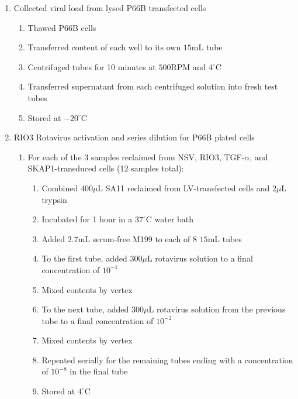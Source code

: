 \begin{enumerate}
	\item Collected viral load from lysed P66B transfected cells
		\begin{enumerate}
			\item Thawed P66B cells
			\item Transferred content of each well to its own $15$mL tube
			\item Centrifuged tubes for 10 minutes at $500$RPM and $4^{\circ}$C
			\item Transferred supernatant from each centrifuged solution into fresh test tubes
			\item Stored at $-20^{\circ}$C
		\end{enumerate}
	\item RIO3 Rotavirus activation and series dilution for P66B plated cells
		\begin{enumerate}
			\item For each of the 3 samples reclaimed from NSV, RIO3, TGF-$\alpha$, and SKAP1-transduced cells (12 samples total):
				\begin{enumerate}
					\item Combined $400\mu$L SA11 reclaimed from LV-transfected cells and $2\mu$L trypsin
					\item Incubated for 1 hour in a $37^{\circ}$C water bath
					\item Added $2.7$mL serum-free M199 to each of 8 $15$mL tubes
					\item To the first tube, added $300\mu$L rotavirus solution to a final concentration of $10^{-1}$
					\item Mixed contents by vertex
					\item To the next tube, added $300\mu$L rotavirus solution from the previous tube to a final concentration of $10^{-2}$
					\item Mixed contents by vertex
					\item Repeated serially for the remaining tubes ending with a concentration of $10^{-8}$ in the final tube
					\item Stored at $4^{\circ}$C
				\end{enumerate}
		\end{enumerate}
\end{enumerate}

